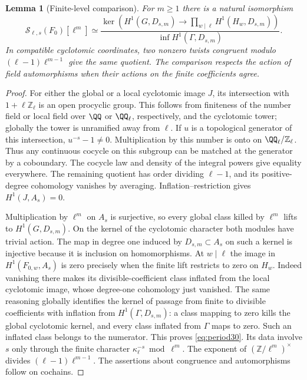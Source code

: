 \documentclass[a4paper,11pt]{article}
\newtheorem{lemma}[proposition]{Lemma}
\theoremstyle{definition}
\theoremstyle{remark}
\newcommand{\ZZ}{\mathbb Z}\newcommand{\ord}{\operatorname{ord}}
\numberwithin{equation}{section}
\newcommand{\Sel}{\mathcal S}
\begin{document}
\begin{lemma}[Finite-level comparison]\leavevmode\label{lem:period30}
For \(m\ge1\) there is a natural isomorphism
\begin{equation}
 \Sel_{\ell,s}(F_0)[\ell^m]\simeq
 \frac{\ker\!\left(H^1(G,D_{s,m})\longrightarrow
             \prod_{w\mid\ell} H^1(H_w,D_{s,m})\right)}
      {\operatorname{inf} H^1(\Gamma,D_{s,m})}.              \label{eq:period30}
\end{equation}
In compatible cyclotomic coordinates, two nonzero twists congruent modulo \((\ell-1)\ell^{m-1}\) give the same quotient. The comparison respects the action of field automorphisms when their actions on the finite coefficients agree.
\end{lemma}
\begin{proof}
For either the global or a local cyclotomic image \(J\), its intersection with \(1+\ell\ZZ_\ell\) is an open procyclic group. This follows from finiteness of the number field or local field over \(\QQ\) or \(\QQ_\ell\), respectively, and the cyclotomic tower; globally the tower is unramified away from \(\ell\). If \(u\) is a topological generator of this intersection, \(u^{-s}-1\ne0\). Multiplication by this number is onto on \(\QQ_\ell/\ZZ_\ell\). Thus any continuous cocycle on this subgroup can be matched at the generator by a coboundary. The cocycle law and density of the integral powers give equality everywhere. The remaining quotient has order dividing \(\ell-1\), and its positive-degree cohomology vanishes by averaging. Inflation--restriction gives \(H^1(J,A_s)=0\).

Multiplication by \(\ell^m\) on \(A_s\) is surjective, so every global class killed by \(\ell^m\) lifts to \(H^1(G,D_{s,m})\). On the kernel of the cyclotomic character both modules have trivial action. The map in degree one induced by \(D_{s,m}\subset A_s\) on such a kernel is injective because it is inclusion on homomorphisms. At \(w\mid\ell\) the image in \(H^1(F_{0,w},A_s)\) is zero precisely when the finite lift restricts to zero on \(H_w\). Indeed vanishing there makes its divisible-coefficient class inflated from the local cyclotomic image, whose degree-one cohomology just vanished. The same reasoning globally identifies the kernel of passage from finite to divisible coefficients with inflation from \(H^1(\Gamma,D_{s,m})\): a class mapping to zero kills the global cyclotomic kernel, and every class inflated from \(\Gamma\) maps to zero. Such an inflated class belongs to the numerator. This proves \eqref{eq:period30}. Its data involve \(s\) only through the finite character \(\kappa_\ell^{-s}\bmod\ell^m\). The exponent of \((\ZZ/\ell^m)^\times\) divides \((\ell-1)\ell^{m-1}\). The assertions about congruence and automorphisms follow on cochains.
\end{proof}
\end{document}
